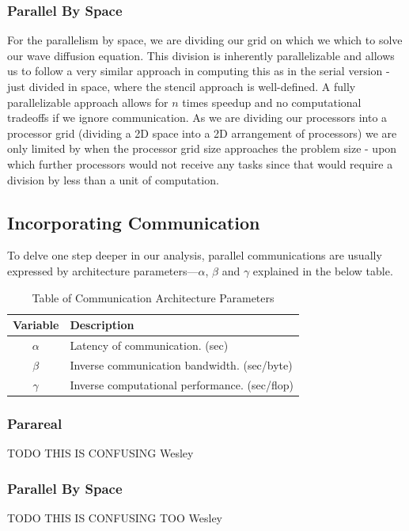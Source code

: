 \documentclass[letterpaper,12pt]{article}
\begin{document}
\subsubsection{Parallel By Space}

For the parallelism by space, we are dividing our grid on which we which to solve our wave diffusion equation. This division is inherently parallelizable and allows us to follow a very similar approach in computing this as in the serial version - just divided in space, where the stencil approach is well-defined. A fully parallelizable approach allows for $n$ times speedup and no computational tradeoffs if we ignore communication. As we are dividing our processors into a processor grid (dividing a 2D space into a 2D arrangement of processors) we are only limited by when the processor grid size approaches the problem size - upon which further processors would not receive any tasks since that would require a division by less than a unit of computation.

\subsection{Incorporating Communication}

To delve one step deeper in our analysis, parallel communications are usually expressed by architecture parameters---$\alpha$, $\beta$ and $\gamma$ explained in the below table.

\begin{table}
\centering
\begin{tabular}{|c|l|}
{\bf Variable} & {\bf Description}\\
\hline\hline
$\alpha$ & Latency of communication. (sec)\\
$\beta$ & Inverse communication bandwidth. (sec/byte)\\
$\gamma$ & Inverse computational performance. (sec/flop)\\
\hline
\end{tabular}
\caption{Table of Communication Architecture Parameters}
\label{tab:notation}
\end{table}

\subsubsection{Parareal}
TODO THIS IS CONFUSING Wesley


\subsubsection{Parallel By Space}
TODO THIS IS CONFUSING TOO Wesley
\end{document}
